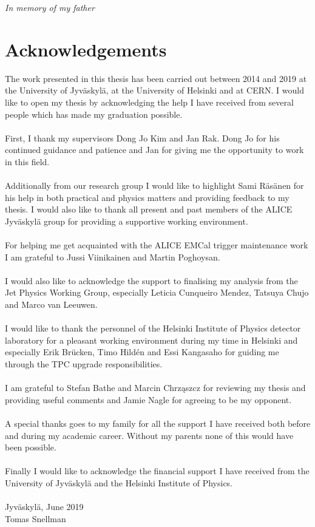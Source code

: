 \clearpage
\begin{flushright}
    \thispagestyle{empty}
    \vspace*{\fill}
    \emph{In memory of my father}
    \vspace*{\fill}
\end{flushright}
\clearpage

\section*{Acknowledgements} 

The work presented in this thesis has been carried out between 2014 and 2019 at the University of Jyväskylä, at the University of Helsinki and at CERN. I would like to open my thesis by acknowledging the help I have received from several people which has made my graduation possible.
\\~\\
\noindent
First, I thank my supervisors Dong Jo Kim and Jan Rak. Dong Jo for his continued guidance and patience and Jan for giving me the opportunity to work in this field.
\\~\\
\noindent
Additionally from our research group I would like to highlight Sami Räsänen for his help in both practical and physics matters and providing feedback to my thesis. I would also like to thank all present and past members of the ALICE Jyväskylä group for providing a supportive working environment.
\\~\\
\noindent For helping me get acquainted with the ALICE EMCal trigger maintenance work I am grateful to Jussi Viinikainen and Martin Poghoysan.
\\~\\
\noindent I would also like to acknowledge the support to finalising my analysis from the Jet Physics Working Group, especially Leticia Cunqueiro Mendez, Tatsuya Chujo and Marco van Leeuwen.
\\~\\
\noindent
I would like to thank the personnel of the Helsinki Institute of Physics detector laboratory for a pleasant working environment during my time in Helsinki and especially Erik Brücken, Timo Hildén and Essi Kangasaho for guiding me through the TPC upgrade responsibilities. 
\\~\\
\noindent
I am grateful to Stefan Bathe and Marcin Chrząszcz for reviewing my thesis and providing useful comments and Jamie Nagle for agreeing to be my opponent.
\\~\\
\noindent
A special thanks goes to my family for all the support I have received both before and during my academic career. Without my parents none of this would have been possible.
\\~\\
\noindent
Finally I would like to acknowledge the financial support I have received from the University of Jyväskylä and the Helsinki Institute of Physics.
\\~\\
Jyväskylä, June 2019\\
Tomas Snellman